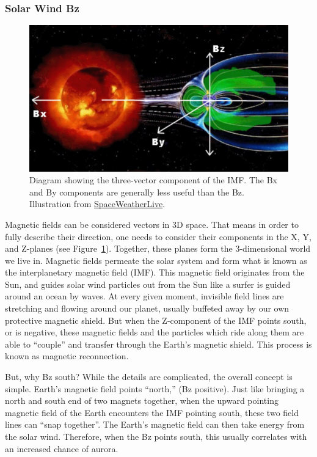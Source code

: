 \documentclass{article}
\begin{document}
\subsubsection{Solar Wind Bz}

\begin{figure}
  \includegraphics[width=\linewidth]{Fig5_IMF.jpg}
  \caption{Diagram showing the three-vector component of the IMF. The Bx and By components are generally less useful than the Bz. Illustration from \href{https://www.spaceweatherlive.com/en/help/the-interplanetary-magnetic-field-imf.html}{SpaceWeatherLive}.}
  \label{fig-bz}
\end{figure}

Magnetic fields can be considered vectors in 3D space. That means in order to fully describe their direction, one needs to consider their components in the X, Y, and Z-planes (see Figure~\ref{fig-bz}). Together, these planes form the 3-dimensional world we live in. Magnetic fields permeate the solar system and form what is known as the interplanetary magnetic field (IMF). This magnetic field originates from the Sun, and guides solar wind particles out from the Sun like a surfer is guided around an ocean by waves. At every given moment, invisible field lines are stretching and flowing around our planet, usually buffeted away by our own protective magnetic shield. But when the Z-component of the IMF points south, or is negative, these magnetic fields and the particles which ride along them are able to ``couple'' and transfer through the Earth's magnetic shield. This process is known as magnetic reconnection. 

But, why Bz south? While the details are complicated, the overall concept is simple. Earth's magnetic field points ``north,'' (Bz positive). Just like bringing a north and south end of two magnets together, when the upward pointing magnetic field of the Earth encounters the IMF pointing south, these two field lines can ``snap together''. The Earth's magnetic field can then take energy from the solar wind. Therefore, when the Bz points south, this usually correlates with an increased chance of aurora.
\end{document}
